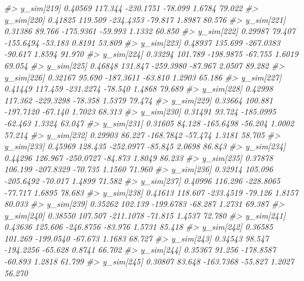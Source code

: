 \documentclass[
  10pt,
  italian,
  a4paper,
  extrafontsizes,onecolumn,openright
  ]{memoir}
\newenvironment{Shaded}{\begin{snugshade}}{\end{snugshade}}
\newcommand{\CommentTok}[1]{\textcolor[rgb]{0.56,0.35,0.01}{\textit{#1}}}
\begin{document}
\begin{Shaded}
\begin{Highlighting}[]
\CommentTok{\#\textgreater{}   y\_sim[219]  0.40569 117.344 {-}230.1751 {-}78.099  1.6784 79.022}
\CommentTok{\#\textgreater{}   y\_sim[220]  0.41825 119.509 {-}234.4353 {-}79.817  1.8987 80.576}
\CommentTok{\#\textgreater{}   y\_sim[221]  0.31386  89.766 {-}175.9361 {-}59.993  1.1332 60.850}
\CommentTok{\#\textgreater{}   y\_sim[222]  0.29987  79.407 {-}155.6494 {-}53.183  0.8191 53.809}
\CommentTok{\#\textgreater{}   y\_sim[223]  0.48937 135.699 {-}267.0383 {-}90.617  1.8594 91.970}
\CommentTok{\#\textgreater{}   y\_sim[224]  0.33294 101.789 {-}198.9875 {-}67.755  1.6019 69.054}
\CommentTok{\#\textgreater{}   y\_sim[225]  0.46848 131.847 {-}259.3980 {-}87.967  2.0507 89.282}
\CommentTok{\#\textgreater{}   y\_sim[226]  0.32167  95.690 {-}187.3611 {-}63.810  1.2903 65.186}
\CommentTok{\#\textgreater{}   y\_sim[227]  0.41449 117.459 {-}231.2274 {-}78.540  1.4868 79.689}
\CommentTok{\#\textgreater{}   y\_sim[228]  0.42998 117.362 {-}229.3298 {-}78.358  1.5379 79.474}
\CommentTok{\#\textgreater{}   y\_sim[229]  0.33664 100.881 {-}197.7120 {-}67.140  1.7023 68.313}
\CommentTok{\#\textgreater{}   y\_sim[230]  0.31491  93.724 {-}185.0995 {-}62.463  1.3324 63.047}
\CommentTok{\#\textgreater{}   y\_sim[231]  0.31605  84.128 {-}165.6498 {-}56.204  1.0002 57.214}
\CommentTok{\#\textgreater{}   y\_sim[232]  0.29903  86.227 {-}168.7842 {-}57.474  1.3181 58.705}
\CommentTok{\#\textgreater{}   y\_sim[233]  0.45969 128.435 {-}252.0977 {-}85.845  2.0698 86.843}
\CommentTok{\#\textgreater{}   y\_sim[234]  0.44296 126.967 {-}250.0727 {-}84.873  1.8049 86.233}
\CommentTok{\#\textgreater{}   y\_sim[235]  0.37878 106.199 {-}207.8329 {-}70.735  1.1560 71.960}
\CommentTok{\#\textgreater{}   y\_sim[236]  0.32914 105.096 {-}205.6492 {-}70.017  1.4899 71.582}
\CommentTok{\#\textgreater{}   y\_sim[237]  0.40996 116.296 {-}228.8065 {-}77.717  1.6895 78.683}
\CommentTok{\#\textgreater{}   y\_sim[238]  0.41613 118.607 {-}233.4519 {-}79.126  1.8157 80.033}
\CommentTok{\#\textgreater{}   y\_sim[239]  0.35262 102.139 {-}199.6783 {-}68.287  1.2731 69.387}
\CommentTok{\#\textgreater{}   y\_sim[240]  0.38550 107.507 {-}211.1078 {-}71.815  1.4537 72.780}
\CommentTok{\#\textgreater{}   y\_sim[241]  0.43636 125.606 {-}246.8756 {-}83.976  1.5731 85.418}
\CommentTok{\#\textgreater{}   y\_sim[242]  0.36585 101.269 {-}199.0540 {-}67.673  1.1683 68.727}
\CommentTok{\#\textgreater{}   y\_sim[243]  0.34543  98.547 {-}194.2256 {-}65.628  0.8741 66.702}
\CommentTok{\#\textgreater{}   y\_sim[244]  0.35367  91.256 {-}178.8587 {-}60.893  1.2818 61.799}
\CommentTok{\#\textgreater{}   y\_sim[245]  0.30807  83.648 {-}163.7368 {-}55.827  1.2027 56.270}

\end{Highlighting}
\end{Shaded}
\end{document}
